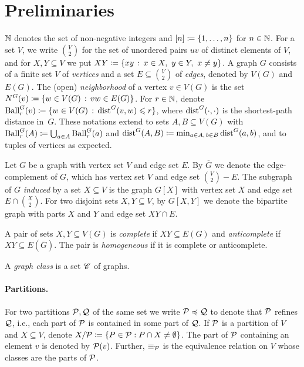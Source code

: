 
\section{Preliminaries}\label{sec:prelims}

$\mathbb N$ denotes the set of non-negative integers and $[n]\coloneqq\{1,\ldots,n\}$ for $n\in\mathbb N$.
For a set $V$, we write $\binom V2$ for the set of unordered pairs $uv$ of distinct elements of $V$, and for $X,Y\subseteq V$ we put $XY\coloneqq\{xy \,:\, x\in X,\ y\in Y,\ x\ne y \}$. A graph $G$ consists of a finite set $V$ of \emph{vertices} and a set $E\subseteq \binom{V}{2}$ of \emph{edges}, denoted by $V(G)$ and $E(G)$.
The (open) \emph{neighborhood} of a vertex $v\in V(G)$ is the set $N^G(v)\coloneqq\{w\in V(G) \,:\, vw\in E(G) \}$.
For $r\in \mathbb N$, denote $\operatorname{Ball}^G_r(v)\coloneqq\{w\in V(G) \,:\, \mathrm{dist}^G(v,w)\leqslant r \}$, where $\mathrm{dist}^G(\cdot,\cdot)$ is the shortest-path distance in~$G$.
These notations extend to sets $A,B\subseteq V(G)$ with $\operatorname{Ball}_r^G(A) \coloneqq \bigcup_{a\in A} \operatorname{Ball}_r^G(a)$ and $\mathrm{dist}^G(A,B)\coloneqq\min_{a\in A,\,b\in B}\mathrm{dist}^G(a,b)$, and to tuples of vertices as expected.


Let $G$ be a graph with vertex set $V$ and edge set $E$. By $\overline G$ we denote the edge-complement of $G$, which has  vertex set $V$ and edge set $\binom{V}{2}-E$.
The subgraph of $G$ \emph{induced} by a set $X\subseteq V$ is the graph $G[X]$ with vertex set $X$ and edge set $E\cap \binom{X}{2}$. For two disjoint sets $X,Y\subseteq V$,
by $G[X,Y]$ we denote the bipartite graph with parts $X$ and $Y$ and edge set $XY\cap E$.

A pair of sets $X,Y\subseteq V(G)$ is \emph{complete} if $XY\subseteq E(G)$ and \emph{anticomplete} if $XY\subseteq E(\overline G)$. The pair is \emph{homogeneous} if it is complete or anticomplete.


A \emph{graph class} is a set $\mathscr C$ of graphs.


\paragraph{Partitions.}
For two partitions $\mathcal P,\mathcal Q$ of the same set we write $\mathcal P\preccurlyeq \mathcal Q$ to denote that $\mathcal P$ refines $\mathcal Q$, i.e., each part of $\mathcal P$ is contained in some part of $\mathcal Q$.
If $\mathcal P$ is a partition of $V$ and $X\subseteq V$, denote
$X/\mathcal P\coloneqq\{P\in\mathcal P:P\cap X\ne\emptyset\}$.
The part of $\mathcal P$ containing an element $v$ is denoted by $\mathcal P(v)$.
Further, $\equiv_\mathcal P$ is the equivalence relation on $V$ whose classes are the parts of $\mathcal P$.


